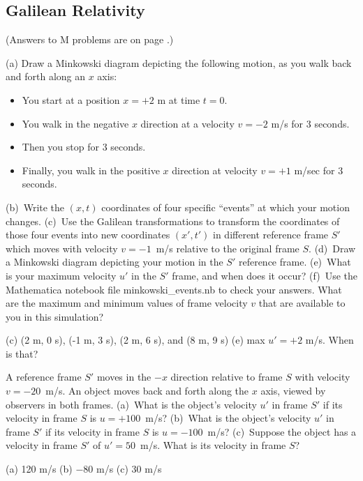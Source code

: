 \subsection{Galilean Relativity} 

(Answers to M problems are on page \pageref{galilean_relativity_prob_answers}.)


\begin{Exercise}[difficulty=1]
(a) Draw a Minkowski diagram depicting the following motion, as you walk back and forth along an $x$ axis: 
\begin{itemize}[nosep]
\item You start at a position $x=+2$ m at time $t=0$.
\item You walk in the negative $x$ direction at a velocity $v=-2$ m/s for 3 seconds.
\item Then you stop for 3 seconds.
\item Finally, you walk in the positive $x$ direction at velocity $v=+1$ m/sec for 3 seconds.
\end{itemize}
(b)~Write the $(x,t)$ coordinates of four specific ``events'' at which your motion changes.  
(c)~Use the Galilean transformations to transform the coordinates of those four events into new coordinates $(x',t')$ in different reference frame $S'$ which moves with velocity $v=-1$~m/s relative to the original frame $S$.  
(d)~Draw a Minkowski diagram depicting your motion in the $S'$ reference frame.  
(e)~What is your maximum velocity $u'$ in the $S'$ frame, and when does it occur?  
(f)~Use the Mathematica notebook file minkowski\_events.nb to check your answers.  What are the maximum and minimum values of frame velocity $v$ that are available to you in this simulation?
\end{Exercise}
\begin{Answer}
(c) (2 m, 0 s), (-1 m, 3 s), (2 m, 6 s), and (8 m, 9 s)  (e) max $u'=+2$ m/s.  When is that? 
\end{Answer}


\begin{Exercise}[difficulty=1]
A reference frame $S'$ moves in the $-x$ direction relative to frame $S$ with velocity $v=-20$~m/s.  An object moves back and forth along the $x$ axis, viewed by observers in both frames.  (a)~What is the object's velocity $u'$ in frame $S'$ if its velocity in frame $S$ is $u=+100$~m/s?  (b)~What is the object's velocity $u'$ in frame $S'$ if its velocity in frame $S$ is $u=-100$~m/s?  (c)~Suppose the object has a velocity in frame $S'$ of $u'=50$~m/s.  What is its velocity in frame $S$?
\end{Exercise}
\begin{Answer}
(a) 120 m/s (b) $-80$ m/s (c) 30 m/s
\end{Answer}



